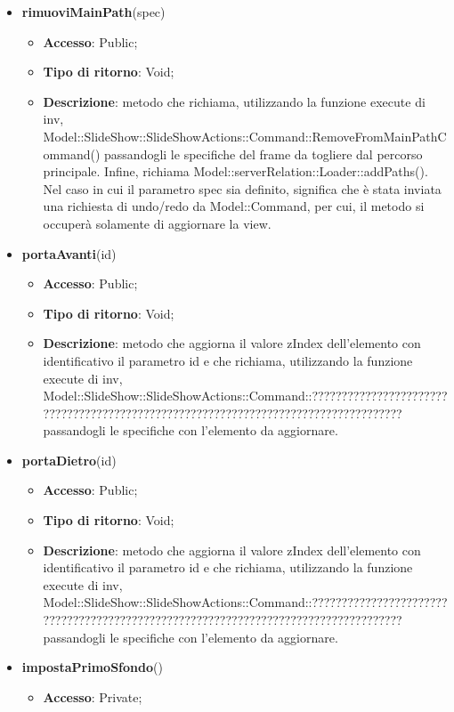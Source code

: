 {{\begin{itemize}
		\item \textbf{rimuoviMainPath}(spec)
		\begin{itemize}
			\item \textbf{Accesso}: Public;
			\item \textbf{Tipo di ritorno}: Void;
			\item \textbf{Descrizione}: metodo che richiama, utilizzando la funzione execute di inv, Model::\-SlideShow::\-SlideShowActions::\-Command::\-RemoveFromMainPathCommand() passandogli le specifiche del frame da togliere dal percorso principale. Infine, richiama Model::\-serverRelation::\-Loader::\-addPaths(). Nel caso in cui il parametro spec sia definito, significa che è stata inviata una richiesta di undo/redo da Model::\-Command, per cui, il metodo si occuperà solamente di aggiornare la view.
		\end{itemize}
		\item \textbf{portaAvanti}(id)
		\begin{itemize}
			\item \textbf{Accesso}: Public;
			\item \textbf{Tipo di ritorno}: Void;
			\item \textbf{Descrizione}: metodo che aggiorna il valore zIndex dell'elemento con identificativo il parametro id e che richiama, utilizzando la funzione execute di inv, Model::\-SlideShow::\-SlideShowActions::\-Command::\-???????????????????????????????????????????????????????????????????????????????????? passandogli le specifiche con l'elemento da aggiornare.
		\end{itemize}
		\item \textbf{portaDietro}(id)
		\begin{itemize}
			\item \textbf{Accesso}: Public;
			\item \textbf{Tipo di ritorno}: Void;
			\item \textbf{Descrizione}: metodo che aggiorna il valore zIndex dell'elemento con identificativo il parametro id e che richiama, utilizzando la funzione execute di inv, Model::\-SlideShow::\-SlideShowActions::\-Command::\-???????????????????????????????????????????????????????????????????????????????????? passandogli le specifiche con l'elemento da aggiornare.
		\end{itemize}
		\item \textbf{impostaPrimoSfondo}()
		\begin{itemize}
			\item \textbf{Accesso}: Private;

\end{itemize}
\end{itemize}}}
